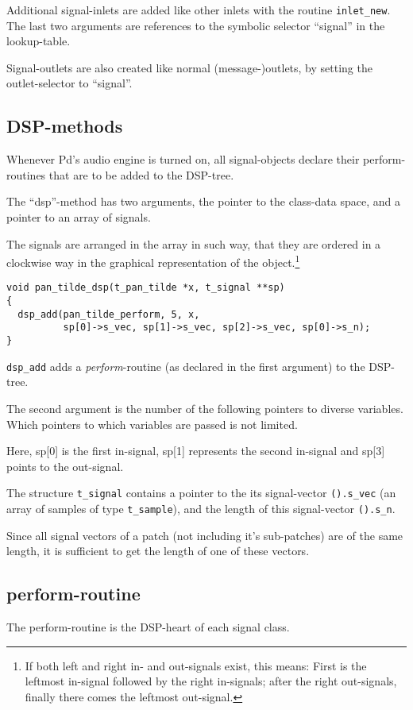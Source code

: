 \documentclass[12pt, a4paper,english,titlepage]{article}
\begin{document}
Additional signal-inlets are added like other inlets with the routine \verb+inlet_new+.
The last two arguments are references to the symbolic selector ``signal''
in the lookup-table.

Signal-outlets are also created like normal (message-)outlets,
by setting the outlet-selector to ``signal''.

\subsection{DSP-methods}
Whenever Pd's audio engine is turned on,
all signal-objects declare their perform-routines that are to be added to the DSP-tree.

The ``dsp''-method has two arguments, the pointer to the class-data space, and 
a pointer to an array of signals.

The signals are arranged in the array in such way,
that they are ordered in a clockwise way in the graphical representation of the
object.\footnote{
If both left and right in- and out-signals exist, this means:
First is the leftmost in-signal followed by the right in-signals;
after the right out-signals, finally there comes the leftmost out-signal.}

\begin{verbatim}
void pan_tilde_dsp(t_pan_tilde *x, t_signal **sp)
{
  dsp_add(pan_tilde_perform, 5, x,
          sp[0]->s_vec, sp[1]->s_vec, sp[2]->s_vec, sp[0]->s_n);
}
\end{verbatim}

\verb+dsp_add+ adds a {\em perform}-routine (as declared in the first argument)
to the DSP-tree.

The second argument is the number of the following pointers to diverse variables.
Which pointers to which variables are passed is not limited.

Here, sp[0] is the first in-signal, sp[1] represents the second in-signal and
sp[3] points to the out-signal.

The structure \verb+t_signal+ contains a pointer to the
its signal-vector \verb+().s_vec+ (an array of samples of type  \verb+t_sample+),
and the length of this signal-vector \verb+().s_n+.

Since all signal vectors of a patch (not including it's sub-patches) are of the same length,
it is sufficient to get the length of one of these vectors.

\subsection{perform-routine}
The perform-routine is the DSP-heart of each signal class.
\end{document}
